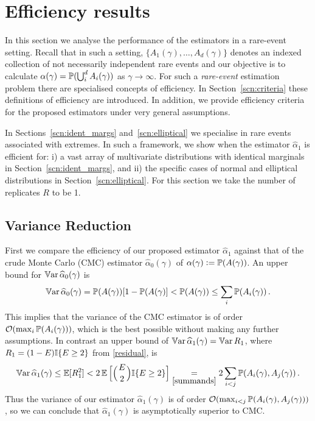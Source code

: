 \section{Efficiency results} \label{scn:efficiency_results}

In this section we analyse the performance of the estimators in a rare-event
setting.  Recall that in such a setting, $\{A_1(\gamma),\dots,A_d(\gamma)\}$ denotes 
an indexed collection of not necessarily independent rare events and our objective is to
calculate $\alpha(\gamma)=\operatorname{{\mathbb P}}(\bigcup_{i}^d A_i(\gamma))$ as $\gamma\to\infty$.
For such a \emph{rare-event} estimation problem there are specialised concepts of efficiency. In Section~\ref{scn:criteria} these definitions of efficiency are introduced. In addition,
we provide efficiency criteria for the proposed estimators under very general assumptions. 

In Sections~\ref{scn:ident_margs} and~\ref{scn:elliptical} we specialise in rare events associated with extremes. 
In such a framework, we show when the estimator $\hat{\alpha}_1$ is efficient for: i) 
a vast array of multivariate distributions with
identical marginals in Section~\ref{scn:ident_margs}, and ii) the specific cases of normal and elliptical distributions in Section~\ref{scn:elliptical}.
For this section we take the number of replicates $R$ to be 1.

\subsection{Variance Reduction} \label{scn:Vreduction}

First we compare the efficiency of our proposed estimator $\hat{\alpha}_1$ against that of
the crude Monte Carlo (CMC) estimator $\hat{\alpha}_0(\gamma)$ 
of $\alpha(\gamma):=\operatorname{{\mathbb P}}(A(\gamma))$. 
An upper bound for $\operatorname{\mathbb{V}\mathrm{ar}} \widehat{\alpha}_0(\gamma)$ is
\begin{equation*}
	\operatorname{\mathbb{V}\mathrm{ar}} \widehat{\alpha}_0(\gamma) = \operatorname{{\mathbb P}}(A(\gamma)) [1 - \operatorname{{\mathbb P}}(A(\gamma)] < \operatorname{{\mathbb P}}( A(\gamma) ) 
	\le \sum_i \operatorname{{\mathbb P}}(A_i(\gamma)) \,.
\end{equation*}
This implies that the variance of the CMC estimator is of order 
${\mathcal{O}}(\max_i \operatorname{{\mathbb P}}(A_i(\gamma)))$,
which is the best possible without making any further assumptions.
In contrast an upper bound of $\operatorname{\mathbb{V}\mathrm{ar}} \widehat{\alpha}_1(\gamma) = \operatorname{\mathbb{V}\mathrm{ar}} R_1$, where $R_1 =(1-E) \mathbb I\{E \ge 2\}$ from \eqref{residual}, is
\begin{equation}
	\operatorname{\mathbb{V}\mathrm{ar}}\widehat{\alpha}_1(\gamma) \le \operatorname{{\mathbb E}}[R_1^2] < 2 \operatorname{{\mathbb E}} \Big[ \Bigl({{E}\atop2}\Bigr) \mathbb I\{E \ge 2\} \Big] \underset{\eqref{summands}}{=} 2 \sum_{i<j} \operatorname{{\mathbb P}}(A_i(\gamma), A_j(\gamma)) \,. \label{Bound}
\end{equation}
Thus the variance of our estimator $\hat{\alpha}_1(\gamma)$ is of order 
${\mathcal{O}}(\max_{i<j} \operatorname{{\mathbb P}}(A_i(\gamma), A_j(\gamma)))$,
so we can conclude that $\hat{\alpha}_1(\gamma)$ is asymptotically superior to CMC.

